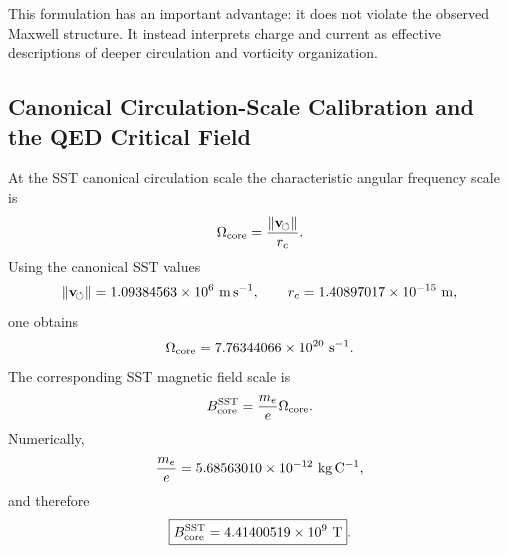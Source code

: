     This formulation has an important advantage: it does not violate the
    observed Maxwell structure.  It instead interprets charge and current as
    effective descriptions of deeper circulation and vorticity organization.

\subsection{Canonical Circulation-Scale Calibration and the QED Critical Field}
    
    At the SST canonical circulation scale the characteristic angular frequency scale is
    \begin{equation}
        \Omega_{\rm core}
        =
        \frac{\lVert\mathbf{v}_{\!\boldsymbol{\circlearrowleft}}\rVert}{r_c}.
        \label{eq:omega_core}
    \end{equation}
    Using the canonical SST values
    \begin{equation}
        \lVert\mathbf{v}_{\!\boldsymbol{\circlearrowleft}}\rVert
        =
        1.09384563\times10^{6}\ {\rm m\,s^{-1}},
        \qquad
        r_c
        =
        1.40897017\times10^{-15}\ {\rm m},
    \end{equation}
    one obtains
    \begin{equation}
        \Omega_{\rm core}
        =
        7.76344066\times10^{20}\ {\rm s^{-1}}.
        \label{eq:omega_core_numeric}
    \end{equation}
    The corresponding SST magnetic field scale is
    \begin{equation}
        B_{\rm core}^{\rm SST}
        =
        \frac{m_e}{e}\Omega_{\rm core}.
        \label{eq:Bcore_sst}
    \end{equation}
    Numerically,
    \begin{equation}
        \frac{m_e}{e}
        =
        5.68563010\times10^{-12}\ {\rm kg\,C^{-1}},
    \end{equation}
    and therefore
    \begin{equation}
        \boxed{
            B_{\rm core}^{\rm SST}
            =
            4.41400519\times10^{9}\ {\rm T}
        } .
        \label{eq:Bcore_numeric}
    \end{equation}
    
